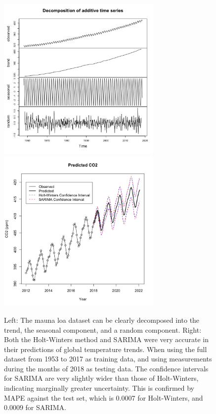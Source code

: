 \documentclass{article}
\begin{document}
\begin{figure}[h]
	\includegraphics[width = 8cm, height = 8cm]{decomposition.jpg}
	\includegraphics[width = 8cm, height = 8cm]{totalconfint.png}
	\caption{Left: The mauna loa dataset can be clearly decomposed into the trend, the seasonal component, and a random component. Right: Both the Holt-Winters method and SARIMA were very accurate in their predictions of global temperature trends. When using the full dataset from 1953 to 2017 as training data, and using measurements during the months of 2018 as testing data. The confidence intervals for SARIMA are very slightly wider than those of Holt-Winters, indicating marginally greater uncertainty. This is confirmed by MAPE against the test set, which is 0.0007 for Holt-Winters, and 0.0009 for SARIMA.}
\end{figure}
\end{document}
